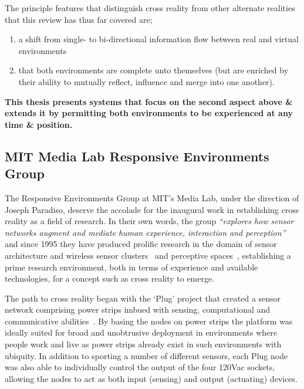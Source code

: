 The principle features that distinguish cross reality from other alternate realities that this review has thus far covered are;
\begin{enumerate}
	\item a shift from single- to bi-directional information flow between real and virtual environments~\cite{kim:practical}
	\item that both environments are complete unto themselves (but are enriched by their ability to mutually reflect, influence and merge into one another).~\cite{lifton:merging}
\end{enumerate}

\textbf{This thesis presents systems that focus on the second aspect above \& extends it by permitting both environments to be experienced at any time \& position.}

\subsection{MIT Media Lab Responsive Environments Group}
\label{subsec:responsive_environments_at_mit_media_lab}
The Responsive Environments Group at MIT's Media Lab, under the direction of Joseph Paradiso, deserve the accolade for the inaugural work in establishing cross reality as a field of research. In their own words, the group \textit{``explores how sensor networks augment and mediate human experience, interaction and perception''}~\cite{ResponsiveEnvironmentsGroup} and since 1995 they have produced prolific research in the domain of sensor architecture and wireless sensor clusters~\cite{Paradiso1996, Rowe1999, Burke1996, Paradiso1997, Knaian2000, Teegarden2001, A2007, Ma2002, Bamberg2008, Laibowitz2005, LaPenta2007} and perceptive spaces~\cite{Lifton2001, Paradiso1997a, Paradiso2000, Richardson2004}, establishing a prime research environment, both in terms of experience and available technologies, for a concept such as cross reality to emerge.

The path to cross reality began with the `Plug' project that created a sensor network comprising power strips imbued with sensing, computational and communicative abilities~\cite{Lifton2007b}. By basing the nodes on power strips the platform was ideally suited for broad and unobtrusive deployment in environments where people work and live as power strips already exist in such environments with ubiquity. In addition to sporting a number of different sensors, each Plug node was also able to individually control the output of the four 120Vac sockets, allowing the nodes to act as both input (sensing) and output (actuating) devices.


